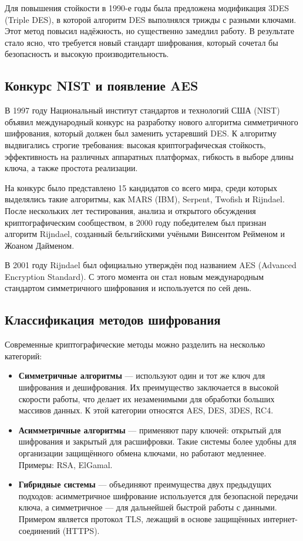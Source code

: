 Для повышения стойкости в 1990-е годы была предложена модификация 3DES (Triple DES), в которой алгоритм DES выполнялся трижды с разными ключами. Этот метод повысил надёжность, но существенно замедлил работу. В результате стало ясно, что требуется новый стандарт шифрования, который сочетал бы безопасность и высокую производительность.  

\subsection{Конкурс NIST и появление AES}

В 1997 году Национальный институт стандартов и технологий США (NIST) объявил международный конкурс на разработку нового алгоритма симметричного шифрования, который должен был заменить устаревший DES. К алгоритму выдвигались строгие требования: высокая криптографическая стойкость, эффективность на различных аппаратных платформах, гибкость в выборе длины ключа, а также простота реализации.  

На конкурс было представлено 15 кандидатов со всего мира, среди которых выделялись такие алгоритмы, как MARS (IBM), Serpent, Twofish и Rijndael. После нескольких лет тестирования, анализа и открытого обсуждения криптографическим сообществом, в 2000 году победителем был признан алгоритм Rijndael, созданный бельгийскими учёными Винсентом Рейменом и Жоаном Дайменом.  

В 2001 году Rijndael был официально утверждён под названием AES (Advanced Encryption Standard). С этого момента он стал новым международным стандартом симметричного шифрования и используется по сей день.  

\subsection{Классификация методов шифрования}

Современные криптографические методы можно разделить на несколько категорий:  

\begin{itemize}
	\item \textbf{Симметричные алгоритмы} — используют один и тот же ключ для шифрования и дешифрования. Их преимущество заключается в высокой скорости работы, что делает их незаменимыми для обработки больших массивов данных. К этой категории относятся AES, DES, 3DES, RC4.  
	\item \textbf{Асимметричные алгоритмы} — применяют пару ключей: открытый для шифрования и закрытый для расшифровки. Такие системы более удобны для организации защищённого обмена ключами, но работают медленнее. Примеры: RSA, ElGamal.  
	\item \textbf{Гибридные системы} — объединяют преимущества двух предыдущих подходов: асимметричное шифрование используется для безопасной передачи ключа, а симметричное — для дальнейшей быстрой работы с данными. Примером является протокол TLS, лежащий в основе защищённых интернет-соединений (HTTPS).  
\end{itemize}

